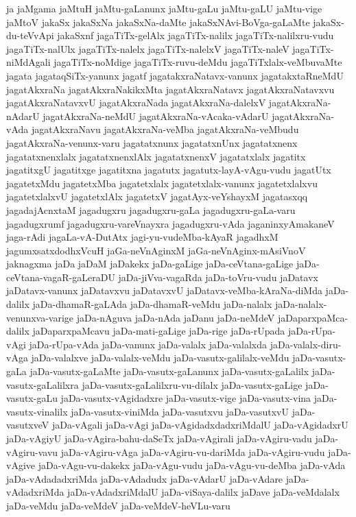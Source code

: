{ja
jaMgama
jaMtuH
jaMtu-gaLanunx
jaMtu-gaLu
jaMtu-gaLU
jaMtu-vige
jaMtoV
jakaSx
jakaSxNa
jakaSxNa-daMte
jakaSxNAvi-BoVga-gaLaMte
jakaSx-du-teVvApi
jakaSxnf
jagaTiTx-gelAlx
jagaTiTx-nalilx
jagaTiTx-nalilxru-vudu
jagaTiTx-nalUlx
jagaTiTx-nalelx
jagaTiTx-nalelxV
jagaTiTx-naleV
jagaTiTx-niMdAgali
jagaTiTx-noMdige
jagaTiTx-ruvu-deMdu
jagaTiTxlalx-veMbuvaMte
jagata
jagataqSiTx-yanunx
jagatf
jagatakxraNatavx-vanunx
jagatakxtaRneMdU
jagatAkxraNa
jagatAkxraNakikxMta
jagatAkxraNatavx
jagatAkxraNatavxvu
jagatAkxraNatavxvU
jagatAkxraNada
jagatAkxraNa-dalelxV
jagatAkxraNa-nAdarU
jagatAkxraNa-neMdU
jagatAkxraNa-vAcaka-vAdarU
jagatAkxraNa-vAda
jagatAkxraNavu
jagatAkxraNa-veMba
jagatAkxraNa-veMbudu
jagatAkxraNa-venunx-varu
jagatatxnunx
jagatatxnUnx
jagatatxnenx
jagatatxnenxlalx
jagatatxnenxlAlx
jagatatxnenxV
jagatatxlalx
jagatitx
jagatitxgU
jagatitxge
jagatitxna
jagatutx
jagatutx-layA-vAgu-vudu
jagatUtx
jagatetxMdu
jagatetxMba
jagatetxlalx
jagatetxlalx-vanunx
jagatetxlalxvu
jagatetxlalxvU
jagatetxlAlx
jagatetxV
jagatAyx-veYshayxM
jagatasxqq
jagadajAcnxtaM
jagadugxru
jagadugxru-gaLa
jagadugxru-gaLa-varu
jagadugxrumf
jagadugxru-vareVnayxra
jagadugxru-vAda
jaganinxyAmakaneV
jaga-rAdi
jagaLa-vA-DutAtx
jagi-yu-vudeMba-kAyaR
jagadhxM
jagumxsatxdodhxVcuH
jaGa-neVnAginxM
jaGa-neVnAginx-mAsiVnoV
jaknagxma
jaDa
jaDaM
jaDakekx
jaDa-gaLige
jaDa-ceVtana-gaLige
jaDa-ceVtana-vagaR-gaLeraDU
jaDa-jiVva-vagaRda
jaDa-toVru-vudu
jaDatavx
jaDatavx-vanunx
jaDatavxvu
jaDatavxvU
jaDatavx-veMba-kAraNa-diMda
jaDa-dalilx
jaDa-dhamaR-gaLAda
jaDa-dhamaR-veMdu
jaDa-nalalx
jaDa-nalalx-venunxva-varige
jaDa-nAguva
jaDa-nAda
jaDanu
jaDa-neMdeV
jaDaparxpaMca-dalilx
jaDaparxpaMcavu
jaDa-mati-gaLige
jaDa-rige
jaDa-rUpada
jaDa-rUpa-vAgi
jaDa-rUpa-vAda
jaDa-vanunx
jaDa-valalx
jaDa-valalxda
jaDa-valalx-diru-vAga
jaDa-valalxve
jaDa-valalx-veMdu
jaDa-vasutx-galilalx-veMdu
jaDa-vasutx-gaLa
jaDa-vasutx-gaLaMte
jaDa-vasutx-gaLanunx
jaDa-vasutx-gaLalilx
jaDa-vasutx-gaLalilxra
jaDa-vasutx-gaLalilxru-vu-dilalx
jaDa-vasutx-gaLige
jaDa-vasutx-gaLu
jaDa-vasutx-vAgidadxre
jaDa-vasutx-vige
jaDa-vasutx-vina
jaDa-vasutx-vinalilx
jaDa-vasutx-viniMda
jaDa-vasutxvu
jaDa-vasutxvU
jaDa-vasutxveV
jaDa-vAgali
jaDa-vAgi
jaDa-vAgidadxdadxriMdalU
jaDa-vAgidadxrU
jaDa-vAgiyU
jaDa-vAgira-bahu-daSeTx
jaDa-vAgirali
jaDa-vAgiru-vadu
jaDa-vAgiru-vavu
jaDa-vAgiru-vAga
jaDa-vAgiru-vu-dariMda
jaDa-vAgiru-vudu
jaDa-vAgive
jaDa-vAgu-vu-dakekx
jaDa-vAgu-vudu
jaDa-vAgu-vu-deMba
jaDa-vAda
jaDa-vAdadadxriMda
jaDa-vAdadudx
jaDa-vAdarU
jaDa-vAdare
jaDa-vAdadxriMda
jaDa-vAdadxriMdalU
jaDa-viSaya-dalilx
jaDave
jaDa-veMdalalx
jaDa-veMdu
jaDa-veMdeV
jaDa-veMdeV-heVLu-varu
}
